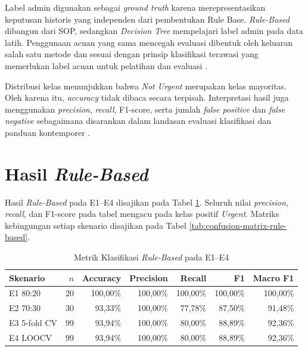Label admin digunakan sebagai \textit{ground truth} karena merepresentasikan keputusan historis yang independen dari pembentukan Rule Base. \textit{Rule-Based} dibangun dari SOP, sedangkan \textit{Decision Tree} mempelajari label admin pada data latih. Penggunaan acuan yang sama mencegah evaluasi dibentuk oleh keluaran salah satu metode dan sesuai dengan prinsip klasifikasi terawasi yang memerlukan label acuan untuk pelatihan dan evaluasi \cite{JamesEtAl2023}.

Distribusi kelas menunjukkan bahwa \textit{Not Urgent} merupakan kelas mayoritas. Oleh karena itu, \textit{accuracy} tidak dibaca secara terpisah. Interpretasi hasil juga menggunakan \textit{precision}, \textit{recall}, F1-score, serta jumlah \textit{false positive} dan \textit{false negative} sebagaimana disarankan dalam landasan evaluasi klasifikasi dan panduan kontemporer \cite{SokolovaLapalme2009,RainioEtAl2024}.

\FloatBarrier

\section{Hasil \textit{Rule-Based}}

Hasil \textit{Rule-Based} pada E1--E4 disajikan pada Tabel \ref{tab:metrik-rule-based}. Seluruh nilai \textit{precision}, \textit{recall}, dan F1-score pada tabel mengacu pada kelas positif \textit{Urgent}. Matriks kebingungan setiap skenario disajikan pada Tabel \ref{tab:confusion-matrix-rule-based}.

\begin{table}[htbp]
    \centering
    \caption{Metrik Klasifikasi \textit{Rule-Based} pada E1--E4}
    \label{tab:metrik-rule-based}
    \scriptsize
    \setlength{\tabcolsep}{4pt}
    \renewcommand{\arraystretch}{1.2}
    \begin{tabular}{lrrrrrr}
        \toprule
        \textbf{Skenario} & \textbf{$n$} & \textbf{Accuracy} & \textbf{Precision} & \textbf{Recall} & \textbf{F1} & \textbf{Macro F1} \\
        \midrule
        E1 80:20 & 20 & 100,00\% & 100,00\% & 100,00\% & 100,00\% & 100,00\% \\
        E2 70:30 & 30 & 93,33\% & 100,00\% & 77,78\% & 87,50\% & 91,48\% \\
        E3 5-fold CV & 99 & 93,94\% & 100,00\% & 80,00\% & 88,89\% & 92,36\% \\
        E4 LOOCV & 99 & 93,94\% & 100,00\% & 80,00\% & 88,89\% & 92,36\% \\
        \bottomrule
    \end{tabular}
\end{table}

